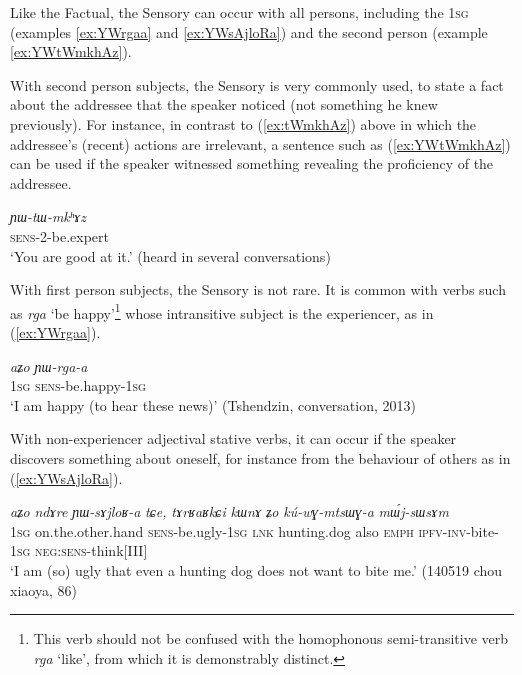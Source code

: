 \documentclass[oldfontcommands,oneside,a4paper,11pt]{article}
\newcommand{\ipa}[1]{{\phon\textit{#1}}} %
\newcommand{\refb}[1]{(\ref{#1})}
\begin{document}
Like the Factual, the Sensory can occur with all persons, including the \textsc{1sg} (examples \ref{ex:YWrgaa} and \ref{ex:YWsAjloRa}) and the second person (example \ref{ex:YWtWmkhAz}).

With second person subjects, the Sensory is very commonly used, to state a fact about the addressee that the speaker noticed (not something he knew previously). For instance, in contrast to \refb{ex:tWmkhAz} above in which the addressee's (recent) actions are irrelevant, a sentence such as \refb{ex:YWtWmkhAz} can be used if the speaker witnessed something revealing the proficiency of the addressee.

\begin{exe}
\ex \label{ex:YWtWmkhAz}
\gll 
 \ipa{ɲɯ-tɯ-mkʰɤz} \\
\textsc{sens}-2-be.expert \\
\glt `You are good at it.' (heard in several conversations)
\end{exe}

With first person subjects, the Sensory is not rare. It is common with verbs such as \ipa{rga} `be happy'\footnote{This verb should not be confused with the homophonous semi-transitive verb \ipa{rga} `like', from which it is demonstrably distinct.} whose intransitive subject is the experiencer, as in \refb{ex:YWrgaa}.

\begin{exe}
\ex \label{ex:YWrgaa}
\gll 
 \ipa{aʑo} \ipa{ɲɯ-rga-a} \\
 \textsc{1sg} \textsc{sens}-be.happy-\textsc{1sg} \\
\glt `I am happy (to hear these news)' (Tshendzin, conversation, 2013)
\end{exe}

With non-experiencer adjectival stative verbs, it can occur if the speaker discovers something about oneself, for instance from the behaviour of others as in \refb{ex:YWsAjloRa}.

\begin{exe}
\ex \label{ex:YWsAjloRa}
\gll 
\ipa{aʑo} 	\ipa{ndɤre} 	\ipa{ɲɯ-sɤjloʁ-a} 	\ipa{tɕe,} \ipa{tɤrʁaʁkɕi} 	\ipa{kɯnɤ} 	\ipa{ʑo} 	\ipa{kú-wɣ-mtsɯɣ-a} 	\ipa{mɯ́j-sɯsɤm} \\
\textsc{1sg} on.the.other.hand \textsc{sens}-be.ugly-\textsc{1sg} \textsc{lnk} hunting.dog also \textsc{emph} \textsc{ipfv-inv}-bite-\textsc{1sg} \textsc{neg:sens}-think[III] \\
\glt `I am (so) ugly that even a hunting dog does not want to bite me.'  (140519 chou xiaoya, 86)
\end{exe}
\end{document}
